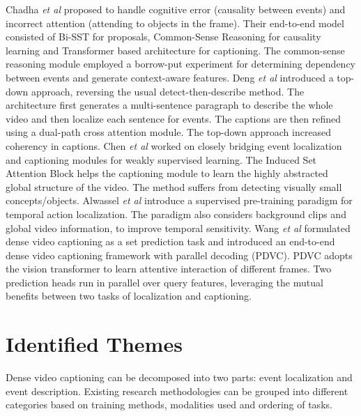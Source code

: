 \par Chadha \textit{et al} \cite{chadha2020iperceive} proposed to handle cognitive error (causality between events) and incorrect attention (attending to objects in the frame). Their end-to-end model consisted of Bi-SST for proposals, Common-Sense Reasoning for causality learning and Transformer based architecture \cite{iashin2020multimodal} for captioning. The common-sense reasoning module employed a borrow-put experiment for determining dependency between events and generate context-aware features. Deng \textit{et al} \cite{deng2021sketch} introduced a top-down approach, reversing the usual detect-then-describe method. The architecture first generates a multi-sentence paragraph to describe the whole video and then localize each sentence for events. The captions are then refined using a dual-path cross attention module. The top-down approach increased coherency in captions. Chen \textit{et al} \cite{chen2021towards} worked on closely bridging event localization and captioning modules for weakly supervised learning. The Induced Set Attention Block helps the captioning module to learn the highly abstracted global structure of the video. The method suffers from detecting visually small concepts/objects. Alwassel \textit{et al} \cite{alwassel2021tsp} introduce a supervised pre-training  paradigm for temporal action localization. The paradigm also considers background clips and global video information, to improve temporal sensitivity. Wang \textit{et al} \cite{wang2021endtoend} formulated dense video captioning as a set prediction task and introduced an end-to-end dense video captioning framework with parallel decoding (PDVC). PDVC adopts the vision transformer to learn attentive interaction of different frames. Two prediction heads run in parallel over query features, leveraging the mutual benefits between two tasks of localization and captioning.

\section{Identified Themes}
\par Dense video captioning can be decomposed into two parts: event localization and event description. Existing research methodologies can be grouped into different categories based on training methods, modalities used and ordering of tasks.

